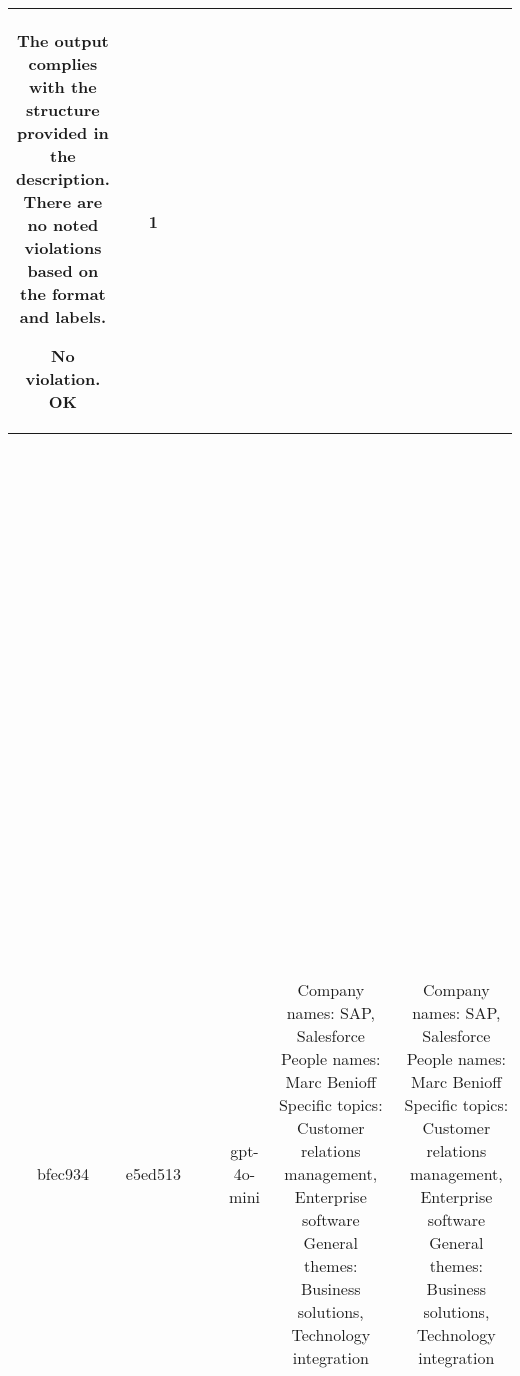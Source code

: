 \begin{table}[h!]
\begin{tabular}{|c|c|c|c|c|c|c|c|c|c|}
The output complies with the structure provided in the description. There are no noted violations based on the format and labels.

No violation.
OK & 1\\
\hline
bfec934 & e5ed513 &  &  & gpt-4o-mini & Company names: SAP, Salesforce
People names: Marc Benioff
Specific topics: Customer relations management, Enterprise software
General themes: Business solutions, Technology integration & Company names: SAP, Salesforce  
People names: Marc Benioff  
Specific topics: Customer relations management, Enterprise software  
General themes: Business solutions, Technology integration   & ok & The output generated by the chatbot follows the desired format detailed in the description. The categories are: "Company names," "People names," "Specific topics," and "General themes," which are clearly provided. The entities are separated by commas where applicable, and each category is followed consistently using a colon. Therefore, based on the output format, no violations of the description's explicit instructions are present. My conclusion is drawn solely from the structure and compliance of the output with the format rules provided.

No violation.
OK & 1\\
\hline
3a1ca71 & e5ed513 &  &  & gpt-4o-mini & Company names: FedEx, UPS
People names: No specific individuals
Specific topics: Logistics, Package delivery
General themes: Transportation, Supply chain management & Company names: FedEx, UPS  
People names: -||-  
Specific topics: Logistics, Package delivery  
General themes: Transportation, Supply chain management   & ok & The chatbot output complies with the described desired format, which includes four distinct categories: company names, people names, specific topics, and general themes. Each category is clearly labeled and followed by a comma-separated list or the placeholder "-||-" if no entities are extracted. The output appears to follow the required structure.

No violation.
OK & 1\\
\hline
60796af & e5ed513 &  &  & gpt-4o-mini & Company names: Sony, Panasonic
People names: No specific individuals
Specific topics: Consumer electronics, Home entertainment
General themes: Innovation, Technology & Company names: Sony, Panasonic  
People names: -||-  
Specific topics: Consumer electronics, Home entertainment  
General themes: Innovation, Technology & ok & The chatbot output complies with the description. It follows the desired format by listing company names, people names, specific topics, and general themes in a structured manner. Each category is clearly presented, matching the example format in the description. The use of '-||-' for the people names section, indicating no names were extracted, is consistent with the description and the format expected.


\end{tabular}
\end{table}
